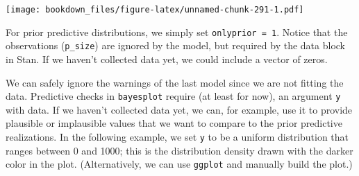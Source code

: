 \documentclass[12pt,]{krantz}
\newenvironment{Shaded}{\begin{snugshade}}{\end{snugshade}}
\newcommand{\CommentTok}[1]{\textcolor[rgb]{0.56,0.35,0.01}{\textit{#1}}}
\newcommand{\DataTypeTok}[1]{\textcolor[rgb]{0.13,0.29,0.53}{#1}}
\newcommand{\DecValTok}[1]{\textcolor[rgb]{0.00,0.00,0.81}{#1}}
\newcommand{\KeywordTok}[1]{\textcolor[rgb]{0.13,0.29,0.53}{\textbf{#1}}}
\newcommand{\NormalTok}[1]{#1}
\newcommand{\OperatorTok}[1]{\textcolor[rgb]{0.81,0.36,0.00}{\textbf{#1}}}
\newcommand{\OtherTok}[1]{\textcolor[rgb]{0.56,0.35,0.01}{#1}}
\newcommand{\StringTok}[1]{\textcolor[rgb]{0.31,0.60,0.02}{#1}}
\theoremstyle{definition}
\theoremstyle{definition}
\theoremstyle{definition}
\theoremstyle{remark}
\begin{document}
\begin{Shaded}
\end{Shaded}

\texttt{[image: bookdown\_files/figure-latex/unnamed-chunk-291-1.pdf]}

For prior predictive distributions, we simply set \texttt{onlyprior\ =\ 1}. Notice that the observations (\texttt{p\_size}) are ignored by the model, but required by the data block in Stan. If we haven't collected data yet, we could include a vector of zeros.

\begin{Shaded}
\end{Shaded}

We can safely ignore the warnings of the last model since we are not fitting the data. Predictive checks in \texttt{bayesplot} require (at least for now), an argument \texttt{y} with data. If we haven't collected data yet, we can, for example, use it to provide plausible or implausible values that we want to compare to the prior predictive realizations. In the following example, we set \texttt{y} to be a uniform distribution that ranges between 0 and 1000; this is the distribution density drawn with the darker color in the plot. (Alternatively, we can use \texttt{ggplot} and manually build the plot.)

\begin{Shaded}
\end{Shaded}
\end{document}
